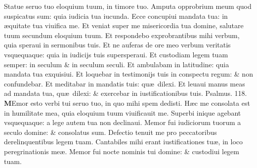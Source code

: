 \documentclass[a5paper,10pt]{book}
\def\ae{æ}
\begin{document}
\begin{multicols*}{2}
\newline \color{red} S\color{black}tatue seruo tuo eloquium tuum, in timore tuo.
\newline \color{red} A\color{black}mputa opprobrium meum quod suspicatus sum: quia iudicia tua iucunda.
\newline \color{red} E\color{black}cce concupiui mandata tua: in \ae quitate tua viuifica me.
\newline \color{red} E\color{black}t veniat super me misericordia tua domine, salutare tuum secundum eloquium tuum.
\newline \color{red} E\color{black}t respondebo exprobrantibus mihi verbum, quia speraui in sermonibus tuis.
\newline \color{red} E\color{black}t ne auferas de ore meo verbum veritatis vsquequaque: quia in iudicijs tuis supersperaui.
\newline \color{red} E\color{black}t custodiam legem tuam semper: in seculum \& in seculum seculi.
\newline \color{red} E\color{black}t ambulabam in latitudine: quia mandata tua exquisiui.
\newline \color{red} E\color{black}t loquebar in testimonijs tuis in conspectu regum: \& non confundebar.
\newline \color{red} E\color{black}t meditabar in mandatis tuis: qu\ae \ dilexi.
\newline \color{red} E\color{black}t leuaui manus meas ad mandata tua, qu\ae \ dilexi: \& exercebar in iustificationibus tuis. \quad \color{red} Psalmus. 118. \color{black}
\vspace{-1em}
\lettrine[lines=2]{\bfseries \color{red} M}{}Emor esto verbi tui seruo tuo, in quo mihi spem dedisti.
\newline \color{red} H\color{black}\ae c me consolata est in humilitate mea, quia eloquium tuum viuificauit me.
\newline \color{red} S\color{black}uperbi inique agebant vsquequaque: a lege autem tua non declinaui.
\newline \color{red} M\color{black}emor fui iudiciorum tuorum a seculo domine: \& consolatus sum.
\newline \color{red} D\color{black}efectio tenuit me pro peccatoribus derelinquentibus legem tuam.
\newline \color{red} C\color{black}antabiles mihi erant iustificationes tu\ae , in loco peregrinationis me\ae .
\newline \color{red} M\color{black}emor fui nocte nominis tui domine: \& custodiui legem tuam.

\end{multicols*}
\end{document}
